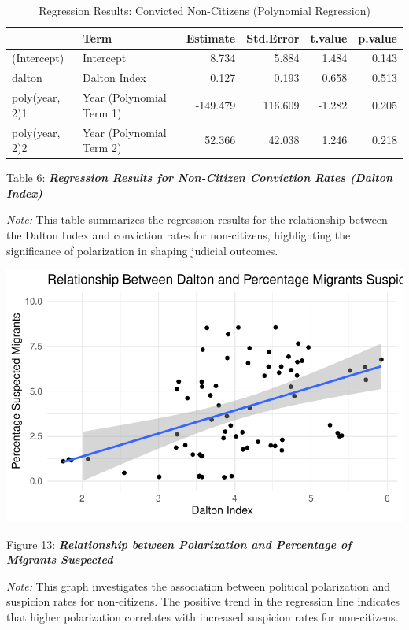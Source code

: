 \documentclass[
]{article}
\begin{document}
\begin{table}
\centering
\caption{Regression Results: Convicted Non-Citizens (Polynomial Regression)}
\centering
\begin{tabular}[t]{l|l|r|r|r|r}
\hline
  & Term & Estimate & Std.Error & t.value & p.value\\
\hline
(Intercept) & Intercept & 8.734 & 5.884 & 1.484 & 0.143\\
\hline
dalton & Dalton Index & 0.127 & 0.193 & 0.658 & 0.513\\
\hline
poly(year, 2)1 & Year (Polynomial Term 1) & -149.479 & 116.609 & -1.282 & 0.205\\
\hline
poly(year, 2)2 & Year (Polynomial Term 2) & 52.366 & 42.038 & 1.246 & 0.218\\
\hline
\end{tabular}
\end{table}

Table 6: \textbf{\emph{Regression Results for Non-Citizen Conviction
Rates (Dalton Index)}}

\emph{Note:} This table summarizes the regression results for the
relationship between the Dalton Index and conviction rates for
non-citizens, highlighting the significance of polarization in shaping
judicial outcomes.

\includegraphics{DataMan_Project_files/figure-pdf/unnamed-chunk-43-1.pdf}

Figure 13: \textbf{\emph{Relationship between Polarization and
Percentage of Migrants Suspected}}

\emph{Note:} This graph investigates the association between political
polarization and suspicion rates for non-citizens. The positive trend in
the regression line indicates that higher polarization correlates with
increased suspicion rates for non-citizens.
\end{document}
